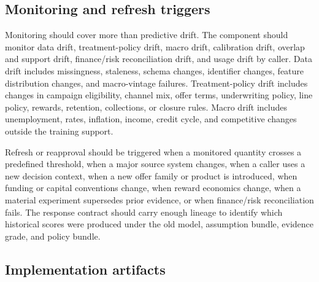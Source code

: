 \documentclass[11pt]{article}
\newcommand{\1}{\mathbf{1}}
\begin{document}
\subsection{Monitoring and refresh triggers}
\label{subsec:monitoring-refresh}

Monitoring should cover more than predictive drift. The component should
monitor data drift, treatment-policy drift, macro drift, calibration drift,
overlap and support drift, finance/risk reconciliation drift, and usage drift
by caller. Data drift includes missingness, staleness, schema changes,
identifier changes, feature distribution changes, and macro-vintage failures.
Treatment-policy drift includes changes in campaign eligibility, channel mix,
offer terms, underwriting policy, line policy, rewards, retention, collections,
or closure rules. Macro drift includes unemployment, rates, inflation, income,
credit cycle, and competitive changes outside the training support.

Refresh or reapproval should be triggered when a monitored quantity crosses a
predefined threshold, when a major source system changes, when a caller uses a
new decision context, when a new offer family or product is introduced, when
funding or capital conventions change, when reward economics change, when a
material experiment supersedes prior evidence, or when finance/risk
reconciliation fails. The response contract should carry enough lineage to
identify which historical scores were produced under the old model,
assumption bundle, evidence grade, and policy bundle.

\subsection{Implementation artifacts}
\label{subsec:implementation-artifacts}
\end{document}
